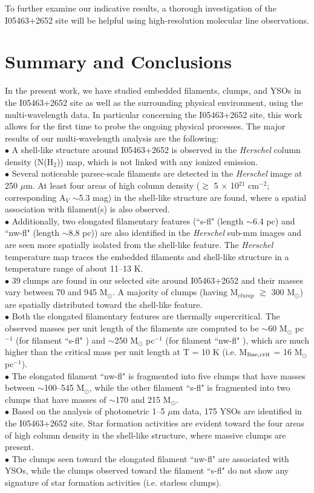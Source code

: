 \documentclass[iop]{emulateapj}
\begin{document}
To further examine our indicative results, a thorough investigation of the I05463+2652 site will be helpful using high-resolution molecular line observations.
%
\section{Summary and Conclusions}
\label{sec:conc}
%
In the present work, we have studied embedded filaments, clumps, and YSOs in the I05463+2652 site as well as 
the surrounding physical environment, using the multi-wavelength data. 
In particular concerning the I05463+2652 site, this work allows for the first time to probe the ongoing physical processes. 
The major results of our multi-wavelength analysis are the following:\\
$\bullet$ A shell-like structure around I05463+2652 is observed in the {\it Herschel} column density (N(H$_{2}$)) map, which is not linked with any ionized emission. \\
$\bullet$ Several noticeable parsec-scale filaments are detected in the {\it Herschel} image at 250 $\mu$m.
At least four areas of high column density ($\gtrsim$ 5 $\times$ 10$^{21}$ cm$^{-2}$; corresponding A$_{V}$ $\sim$5.3 mag) in the shell-like structure are found, where a spatial association with filament(s) is also observed.\\
$\bullet$ Additionally, two elongated filamentary features (``s-fl" (length $\sim$6.4 pc) and ``nw-fl" (length $\sim$8.8 pc)) 
are also identified in the {\it Herschel} sub-mm images 
and are seen more spatially isolated from the shell-like feature. 
The {\it Herschel} temperature map traces the embedded filaments and shell-like structure in a temperature range of about 11--13 K.\\
$\bullet$ 39 clumps are found in our selected site around I05463+2652 and their masses vary 
between 70 and 945 M$_{\odot}$. A majority of clumps (having M$_{clump}$ $\gtrsim$ 300 M$_{\odot}$) 
are spatially distributed toward the shell-like feature.\\
$\bullet$ Both the elongated filamentary features are thermally supercritical. 
The observed masses per unit length of the filaments are computed to be 
$\sim$60 M$_{\odot}$ pc$^{-1}$ (for filament ``s-fl" ) and $\sim$250 M$_{\odot}$ pc$^{-1}$ (for filament ``nw-fl" ), 
which are much higher than the critical mass per unit length at T = 10 K (i.e. M$_{\rm line,crit}$ = 16 M$_{\odot}$ pc$^{-1}$).\\
$\bullet$ The elongated filament ``nw-fl" is fragmented into five clumps that have masses between $\sim$100--545 M$_{\odot}$, 
while the other filament ``s-fl" is fragmented into two clumps that have masses of $\sim$170 and 215 M$_{\odot}$.\\
$\bullet$ Based on the analysis of photometric 1--5 $\mu$m data, 175 YSOs are identified in the I05463+2652 site. 
Star formation activities are evident toward the four areas of high column density in the shell-like structure, where massive clumps are present.\\
$\bullet$ The clumps seen toward the elongated filament ``nw-fl" are associated with YSOs, 
while the clumps observed toward the filament ``s-fl" do not show any signature of star formation activities (i.e. starless clumps).
\end{document}
